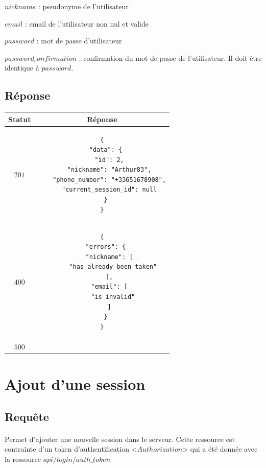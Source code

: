 \documentclass[titlepage, 12pt]{report}
\begin{document}
\par $ nickname $ : pseudonyme de l'utilisateur
\par $ email $ : email de l'utilisateur non nul et valide
\par $ password $ : mot de passe d'utilisateur
\par $ password_confirmation $ : confirmation du mot de passe de l'utilisateur. Il doit être identique à $ password $.

\subsection{Réponse}

\begin{center}
	\begin{tabular}{|c|c|}
		\hline
		Statut & Réponse \\
		\hline
		$ 201 $ & \begin{lstlisting}
{
  "data": {
    "id": 2,
    "nickname": "Arthur83",
    "phone_number": "+33651678908",
    "current_session_id": null
  }
}
\end{lstlisting} \\ 
\hline
$ 400 $ & \begin{lstlisting}
{
  "errors": {
    "nickname": [
      "has already been taken"
    ],
    "email": [
      "is invalid"
    ]
  }
}
		\end{lstlisting} \\
		\hline
		$ 500 $ & \\
		\hline
	\end{tabular}
\end{center}

%
%

\section{Ajout d'une session}

\subsection{Requête}

\paragraph{} Permet d'ajouter une nouvelle session dans le serveur. Cette ressource est contrainte d'un token d'authentification <$Authorization$> qui a été donnée avec la ressource $api/login/auth\_token$
\end{document}
